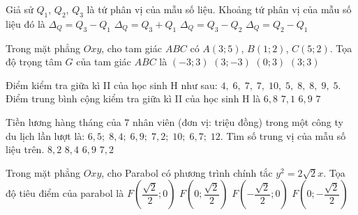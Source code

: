 \begin{ex}%
Giả sử $Q_1$, $Q_2$, $Q_3$ là tứ phân vị của mẫu số liệu. Khoảng tứ phân vị của mẫu số liệu đó là
\choice
{\True $\Delta_Q=Q_3-Q_1$}
{$\Delta_Q=Q_3+Q_1$}
{$\Delta_Q=Q_3-Q_2$}
{$\Delta_Q=Q_2-Q_1$}
\end{ex}

\begin{ex}%
Trong mặt phẳng $Oxy$, cho tam giác $ABC$ có $A\left(3;5\right)$, $B\left(1;2\right)$, $C\left(5;2\right)$. Tọa độ trọng tâm $G$ của tam giác $ABC$ là
\choice
{$\left(-3;3\right)$}
{$\left(3;-3\right)$}
{$\left(0;3\right)$}
{\True $\left(3;3\right)$}
\end{ex}

\begin{ex}%
Điểm kiểm tra giữa kì II của học sinh H như sau: $ 4,\; 6,\; 7,\; 7,\; 10,\; 5,\; 8,\; 8,\; 9,\; 5$. Điểm trung bình cộng kiểm tra giữa kì II của học sinh H là
\choice
{$6{,}8$}
{$7{,}1$}
{\True $6{,}9$}
{$7$}
\end{ex}

\begin{ex}%
Tiền lương hàng tháng của $7$ nhân viên (đơn vị: triệu đồng) trong một công ty du lịch lần lượt là: $ 6,5; \; 8,4; \; 6,9; \; 7,2; \; 10; \; 6,7; \; 12$. Tìm số trung vị của mẫu số liệu trên.
\choice
{$8,2$}
{$8,4$}
{$6,9$}
{\True $7,2$}
\end{ex}

\begin{ex}%
Trong mặt phẳng $Oxy$, cho Parabol có phương trình chính tắc $y^2=2\sqrt{2}x$. Tọa độ tiêu điểm của parabol là
\choice
{\True $F\left(\dfrac{\sqrt{2}}{2};0\right)$}
{$F\left(0;\dfrac{\sqrt{2}}{2}\right)$}
{$F\left(-\dfrac{\sqrt{2}}{2};0\right)$}
{$F\left(0;-\dfrac{\sqrt{2}}{2}\right)$}
\end{ex}

